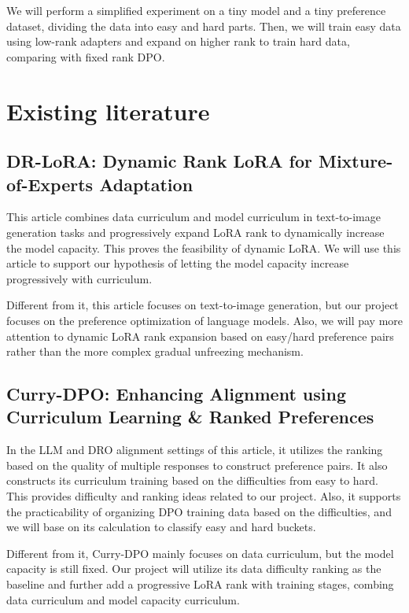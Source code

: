 \documentclass{article}
\begin{document}
We will perform a simplified experiment on a tiny model and a tiny preference dataset, dividing the data into easy and hard parts. Then, we will train easy data using low-rank adapters and expand on higher rank to train hard data, comparing with fixed rank DPO.


\section{Existing literature}

\subsection{DR-LoRA: Dynamic Rank LoRA for Mixture-of-Experts Adaptation \cite{deng2026drlora}}
This article combines data curriculum and model curriculum in text-to-image generation tasks and progressively expand LoRA rank to dynamically increase the model capacity. This proves the feasibility of dynamic LoRA. We will use this article to support our hypothesis of letting the model capacity increase progressively with curriculum.

Different from it, this article focuses on text-to-image generation, but our project focuses on the preference optimization of language models. Also, we will pay more attention to dynamic LoRA rank expansion based on easy/hard preference pairs rather than the more complex gradual unfreezing mechanism.

\subsection{Curry-DPO: Enhancing Alignment using Curriculum Learning \& Ranked Preferences \cite{pattnaik2024currydpo}}
In the LLM and DRO alignment settings of this article, it utilizes the ranking based on the quality of multiple responses to construct preference pairs. It also constructs its curriculum training based on the difficulties from easy to hard. This provides difficulty and ranking ideas related to our project. Also, it supports the practicability of organizing DPO training data based on the difficulties, and we will base on its calculation to classify easy and hard buckets.

Different from it, Curry-DPO mainly focuses on data curriculum, but the model capacity is still fixed. Our project will utilize its data difficulty ranking as the baseline and further add a progressive LoRA rank with training stages, combing data curriculum and model capacity curriculum.
\end{document}
